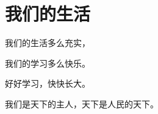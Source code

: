 \documentclass[12pt,UTF-8,openany]{ctexbook}
\begin{document}
\hanzibox{}\hanzibox{}\hanzibox{}\hanzibox{}\hspace{1em}\hanzibox{}\hanzibox{}\hanzibox{}\hanzibox{}

\hanzibox{}\hanzibox{}\hanzibox{}\hanzibox{}\hspace{1em}\hanzibox{}\hanzibox{}\hanzibox{}\hanzibox{}

\hanzibox{}\hanzibox{}\hanzibox{}\hanzibox{}\hspace{1em}\hanzibox{}\hanzibox{}\hanzibox{}\hanzibox{}

\hanzibox{}\hanzibox{}\hanzibox{}\hanzibox{}\hspace{1em}\hanzibox{}\hanzibox{}\hanzibox{}\hanzibox{}






\chapter{我们的生活}

\begin{large}
    
    我们的生活多么充实，
    
    我们的学习多么快乐。
    
    好好学习，快快长大。
    
    我们是天下的主人，天下是人民的天下。
    
\end{large}


\clearpage

\begin{center}
    
    
    
\end{center}


\hanzibox{}\hanzibox{}\hanzibox{}\hanzibox{}\hspace{1em}\hanzibox{}\hanzibox{}\hanzibox{}\hanzibox{}

\hanzibox{}\hanzibox{}\hanzibox{}\hanzibox{}\hspace{1em}\hanzibox{}\hanzibox{}\hanzibox{}\hanzibox{}

\hanzibox{}\hanzibox{}\hanzibox{}\hanzibox{}\hspace{1em}\hanzibox{}\hanzibox{}\hanzibox{}\hanzibox{}
\end{document}
